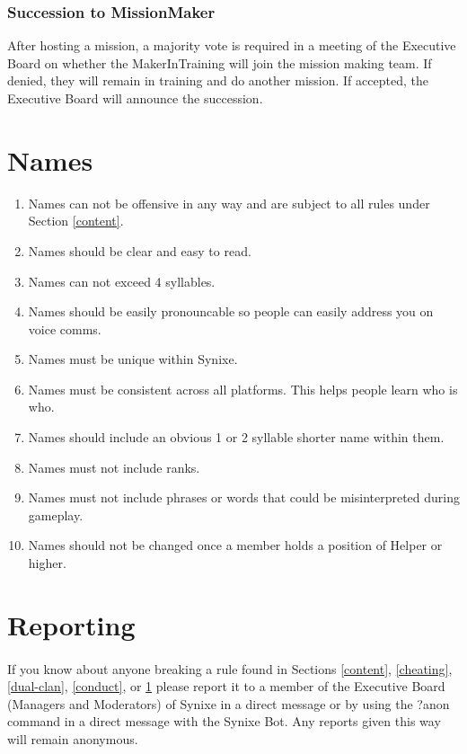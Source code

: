 \documentclass[10pt,a4paper]{article}
\begin{document}
\subsubsection{Succession to MissionMaker}
After hosting a mission, a majority vote is required in a meeting of the Executive Board on whether the MakerInTraining will join the mission making team. If denied, they will remain in training and do another mission. If accepted, the Executive Board will announce the succession.
\section{Names} \label{names}
\begin{enumerate}
	\item Names can not be offensive in any way and are subject to all rules under Section \ref{content}.
	\item Names should be clear and easy to read.
	\item Names can not exceed 4 syllables.
	\item Names should be easily pronouncable so people can easily address you on voice comms.
	\item Names must be unique within Synixe.
	\item Names must be consistent across all platforms. This helps people learn who is who.
	\item Names should include an obvious 1 or 2 syllable shorter name within them.
	\item Names must not include ranks.
	\item Names must not include phrases or words that could be misinterpreted during gameplay.
	\item Names should not be changed once a member holds a position of Helper or higher.
\end{enumerate}
\section{Reporting}
\paragraph{}
If you know about anyone breaking a rule found in Sections \ref{content}, \ref{cheating}, \ref{dual-clan}, \ref{conduct}, or \ref{names} please report it to a member of the Executive Board (Managers and Moderators) of Synixe in a direct message or by using the ?anon command in a direct message with the Synixe Bot. Any reports given this way will remain anonymous.
\end{document}
